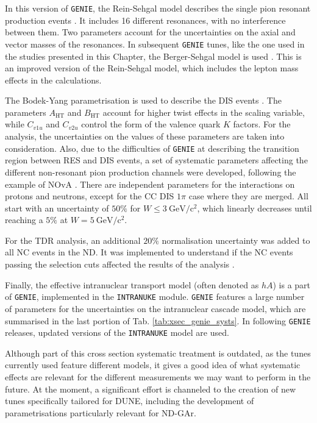 In this version of \texttt{GENIE}, the Rein-Sehgal model describes the single pion resonant production events \cite{Rein1980}. It includes 16 different resonances, with no interference between them. Two parameters account for the uncertainties on the axial and vector masses of the resonances. In subsequent \texttt{GENIE} tunes, like the one used in the studies presented in this Chapter, the Berger-Sehgal model is used \cite{Berger2007}. This is an improved version of the Rein-Sehgal model, which includes the lepton mass effects in the calculations.

The Bodek-Yang parametrisation is used to describe the DIS events \cite{Bodek2002}. The parameters $A_{\mathrm{HT}}$ and $B_{\mathrm{HT}}$ account for higher twist effects in the scaling variable, while $C_{v1u}$ and $C_{v2u}$ control the form of the valence quark $K$ factors. For the analysis, the uncertainties on the values of these parameters are taken into consideration. Also, due to the difficulties of \texttt{GENIE} at describing the transition region between RES and DIS events, a set of systematic parameters affecting the different non-resonant pion production channels were developed, following the example of NOvA \cite{Sanchez2018}. There are independent parameters for the interactions on protons and neutrons, except for the CC DIS $1\pi$ case where they are merged. All start with an uncertainty of $50\%$ for $W \leq 3~\mathrm{GeV/c^{2}}$, which linearly decreases until reaching a $5\%$ at $W = 5~\mathrm{GeV/c^{2}}$.

For the TDR analysis, an additional $20\%$ normalisation uncertainty was added to all NC events in the ND. It was implemented to understand if the NC events passing the selection cuts affected the results of the analysis \cite{DUNE2021}.

Finally, the effective intranuclear transport model (often denoted as $hA$) is a part of \texttt{GENIE}, implemented in the \texttt{INTRANUKE} module. \texttt{GENIE} features a large number of parameters for the uncertainties on the intranuclear cascade model, which are summarised in the last portion of Tab. \ref{tab:xsec_genie_systs}. In following \texttt{GENIE} releases, updated versions of the \texttt{INTRANUKE} model are used.

Although part of this cross section systematic treatment is outdated, as the tunes currently used feature different models, it gives a good idea of what systematic effects are relevant for the different measurements we may want to perform in the future. At the moment, a significant effort is channeled to the creation of new tunes specifically tailored for DUNE, including the development of parametrisations particularly relevant for ND-GAr.

